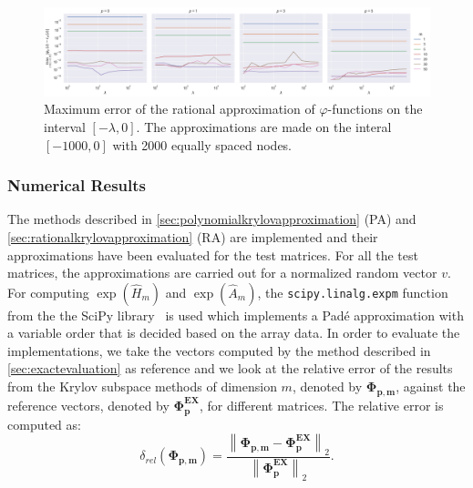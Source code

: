 
\begin{figure}[h!]
    \centering
    \includegraphics[width=.9\textwidth]{img/AAA/errors_ms.png}
    \caption{
        Maximum error of the rational approximation of $\varphi$-functions on the interval
        $[-\lambda, 0]$. The approximations are made on the interal $[-1000, 0]$ with 2000
        equally spaced nodes.
    }
    \label{fig:errorsAAAms}
\end{figure}


\subsubsection*{Numerical Results}
The methods described in \autoref{sec:polynomialkrylovapproximation} (PA)
and \autoref{sec:rationalkrylovapproximation} (RA)
are implemented and their approximations have been evaluated for the test matrices.
For all the test matrices, the approximations are carried out for a normalized
random vector $v$.
For computing $\exp(\hat{H}_m)$ and $\exp(\hat{A}_m)$, the \texttt{scipy.linalg.expm}
function from the the SciPy library~\cite{SciPy2020} is used which implements a Padé
approximation with a variable order that is decided based on the array data.
In order to evaluate the implementations, we take the vectors computed by the method
described in \autoref{sec:exactevaluation} as reference and we look at the relative
error of the results from the Krylov subspace methods of dimension $m$, denoted by
$\mathbf{\Phi_{p, m}}$, against the reference vectors, denoted by $\mathbf{\Phi_p^{EX}}$,
for different matrices. The relative error is computed as:
\begin{equation*}
    \delta_{rel}(\mathbf{\Phi_{p, m}}) =
    \frac{\left\| \mathbf{\Phi_{p, m}} - \mathbf{\Phi_p^{EX}} \right\|_2}
    {\left\| \mathbf{\Phi_p^{EX}} \right\|_2}.
\end{equation*}

